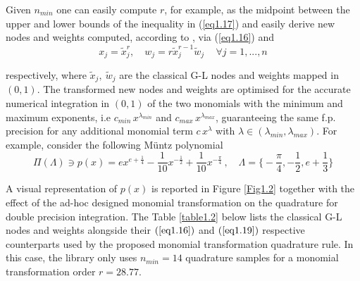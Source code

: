 \documentclass[a4paper, twosided]{book}
\begin{document}
\noindent
Given $n_{min}$ one can easily compute $r$, for example, as the midpoint between the upper and lower bounds of the inequality in (\ref{eq1.17}) and easily derive new nodes and weights computed, according to \cite{Lombardi09,Lombardi21}, via (\ref{eq1.16}) and 
\begin{equation}\label{eq1.19}
    x_j=\tilde{x}_j^{r},\quad w_j = r\tilde{x}_j^{r-1}\tilde{w}_j\,\quad\forall j=1,...,n
\end{equation}

\noindent
respectively, where $\tilde{x}_j,\:\tilde{w}_j$ are the classical G-L nodes and weights mapped in $(0,1)$. The transformed new nodes and weights are optimised for the accurate numerical integration in $(0,1)$ of the two monomials with the minimum and maximum exponents, i.e $c_{min}\,x^{\lambda_{min}}$ and $c_{max}\,x^{\lambda_{max}}$, guaranteeing the same f.p. precision for any additional monomial term $c\,x^\lambda$ with $\lambda \in (\lambda_{min},\lambda_{max})$. For example, consider the following  Müntz polynomial
\begin{equation}\label{eq1.20}
    \Pi(\Lambda)\ni p(x) = ex^{e+\frac{1}{4}} -\frac{1}{10}x^{-\frac{1}{2}} + \frac{1}{10}x^{-\frac{\pi}{4}}\,,\quad\Lambda=\Big\{-\frac{\pi}{4},-\frac{1}{2},e+\frac{1}{3}\Big\}
\end{equation}

\noindent
A visual representation of $p(x)$ is reported in Figure \ref{Fig1.2} together with the effect of the ad-hoc designed monomial transformation on the quadrature for double precision integration. The Table \ref{table1.2} below lists the classical G-L nodes and weights alongside their $(\ref{eq1.16})$ and $(\ref{eq1.19})$ respective counterparts used by the proposed monomial transformation quadrature rule. In this case, the library only uses $n_{min}=14$ quadrature samples for a monomial transformation order $r=28.77$.
\end{document}
